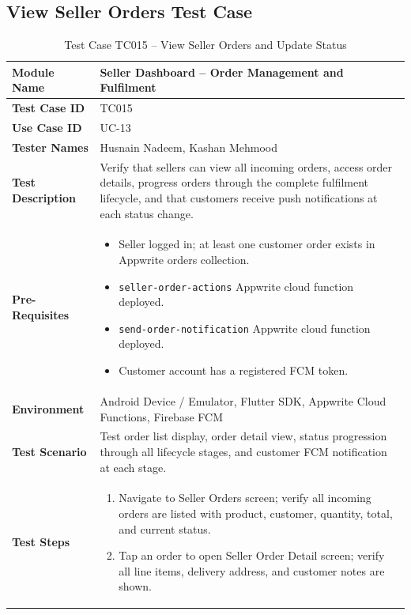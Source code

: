 \subsection{View Seller Orders Test Case}
{\renewcommand{\arraystretch}{1.15}
\small
\setlength{\LTleft}{\fill}
\setlength{\LTright}{\fill}
\begin{longtable}{|p{3.2cm}|p{10.8cm}|}
\caption{Test Case TC015 -- View Seller Orders and Update Status} \label{tab:tc015} \\
\hline
\textbf{Module Name} & Seller Dashboard -- Order Management and Fulfilment \\ \hline
\textbf{Test Case ID} & TC015 \\ \hline
\textbf{Use Case ID} & UC-13 \\ \hline
\textbf{Tester Names} & Husnain Nadeem, Kashan Mehmood \\ \hline
\textbf{Test Description} & Verify that sellers can view all incoming orders, access order details, progress orders through the complete fulfilment lifecycle, and that customers receive push notifications at each status change. \\ \hline
\textbf{Pre-Requisites} &
\begin{itemize}[leftmargin=*,noitemsep]
\item Seller logged in; at least one customer order exists in Appwrite orders collection.
\item \texttt{seller-order-actions} Appwrite cloud function deployed.
\item \texttt{send-order-notification} Appwrite cloud function deployed.
\item Customer account has a registered FCM token.
\end{itemize} \\ \hline
\textbf{Environment} & Android Device / Emulator, Flutter SDK, Appwrite Cloud Functions, Firebase FCM \\ \hline
\textbf{Test Scenario} & Test order list display, order detail view, status progression through all lifecycle stages, and customer FCM notification at each stage. \\ \hline
\textbf{Test Steps} &
\begin{enumerate}[leftmargin=*,noitemsep]
\item Navigate to Seller Orders screen; verify all incoming orders are listed with product, customer, quantity, total, and current status.
\item Tap an order to open Seller Order Detail screen; verify all line items, delivery address, and customer notes are shown.

\end{enumerate}
\end{longtable}}
